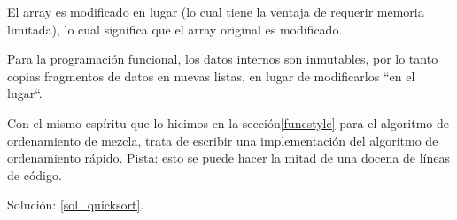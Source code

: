 \begin{exercise}
El array es modificado en lugar (lo cual tiene la ventaja de 
requerir memoria limitada), lo cual significa que el array 
original es modificado.

Para la programación funcional, los datos internos son inmutables, 
por lo tanto copias fragmentos de datos en nuevas listas, en lugar 
de modificarlos ``en el lugar``.

Con el mismo espíritu que lo hicimos en la sección\ref{funcstyle}
para el algoritmo de ordenamiento de mezcla, trata de escribir una
implementación del algoritmo de ordenamiento rápido. Pista: esto 
se puede hacer la mitad de una docena de líneas de código. 

Solución: \ref{sol_quicksort}.

\end{exercise}

